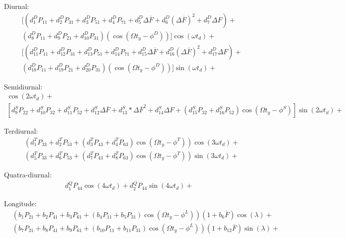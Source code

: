 \documentclass[referee,a4paper,12pt,traditabstract]{swsc}
\begin{document}
\begin{linenumbers}
Diurnal:
\begin{align*}
&[(d^D_1 P_{11}+d^D_2 P_{31}+d^D_3 P_{51}+d^D_4 P_{71} + d^D_5\Delta\overline{F} + d^D_6(\Delta\overline{F})^2 + d^D_7 \Delta F) + \\
&(d^D_8 P_{11} + d^D_9 P_{21} + d^D_{10} P_{31})(\cos(\Omega t_y-\phi^D))]\cos(\omega t_d)+\\
&[(d^D_{11} P_{11}+d^D_{12} P_{31}+d^D_{13} P_{51}+d^D_{14} P_{71} + d^D_{15}\Delta\overline{F} + d^D_{16}(\Delta\overline{F})^2 + d^D_{17} \Delta F) + \\
&(d^D_{18} P_{11} + d^D_{19} P_{21} + d^D_{20} P_{31})(\cos(\Omega t_y-\phi^D))]\sin(\omega t_d)+
\end{align*}

Semidiurnal:
\begin{align*}
[d^S_1 P_{22} + d^S_2 P_{32} + d^S_3 P_{52} + d^S_4\Delta\overline{F} + d^S_5*\Delta\overline{F}^2 + d^S_6 \Delta F + (d^S_7 P_{32} + d^S_8 P_{52})\cos(\Omega t_y-\phi^S)]\cos(2\omega t_d) +\\
[d^S_9 P_{22} + d^S_{10} P_{32} + d^S_{11} P_{52} + d^S_{12}\Delta\overline{F} + d^S_{13}*\Delta\overline{F}^2 + d^S_{14} \Delta F + (d^S_{15} P_{32} + d^S_{16} P_{52})\cos(\Omega t_y-\phi^S)]\sin(2\omega t_d)+
\end{align*}

Terdiurnal:
\begin{align*}
&(d^T_1P_{33} + d^T_2 P_{53} + (d^T_3 P_{43} + d^T_4P_{63})\cos(\Omega t_y-\phi^T))\cos(3\omega t_d)+\\
&(d^T_5P_{33} + d^T_6 P_{53} + (d^T_7 P_{43} + d^T_8P_{63})\cos(\Omega t_y-\phi^T))\sin(3\omega t_d)+
\end{align*}

Quatra-diurnal:
\begin{align*}
d^Q_1 P_{44}\cos(4 \omega t_d) + d^Q_2 P_{44}\sin(4\omega t_d)+
\end{align*}

Longitude:
\begin{align*}
&(b_1 P_{21}+ b_2 P_{41}+ b_3 P_{61} +(b_4 P_{11}+b_5 P_{31})\cos(\Omega t_y-\phi^L))(1+b_6 \overline{F})\cos(\lambda) + \\
&(b_7 P_{21}+ b_8 P_{41}+ b_9 P_{61} +(b_{10} P_{11}+b_{11} P_{31})\cos(\Omega t_y-\phi^L))(1+b_{12} \overline{F})\sin(\lambda) +
\end{align*}


\end{linenumbers}
\end{document}
